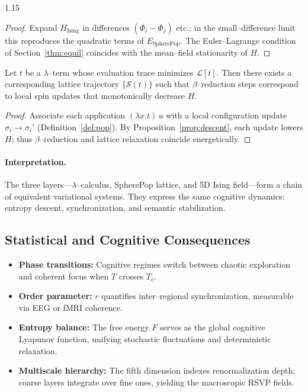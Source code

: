 \documentclass[12pt,a4paper]{article}
\begin{document}
\begin{spacing}{1.15}
\begin{proof}
Expand $H_{\text{Ising}}$ in differences
$(\Phi_i-\Phi_j)$ etc.;
in the small–difference limit this reproduces the quadratic
terms of $E_{\text{SpherePop}}$.
The Euler–Lagrange condition of Section~\ref{thm:equil}
coincides with the mean–field stationarity of $H$.
\end{proof}

\begin{theorem}
\label{thm:lambdaeq}
Let $t$ be a $\lambda$–term whose evaluation trace
minimizes $\mathcal{L}[t]$.
Then there exists a corresponding lattice trajectory
$\{\mathcal{S}(t)\}$ such that
$\beta$–reduction steps correspond to local spin updates
that monotonically decrease $H$.
\end{theorem}

\begin{proof}
Associate each application $(\lambda x.t)\,u$
with a local configuration update $\sigma_i\!\to\!\sigma_i'$
(Definition~\ref{def:pop}).
By Proposition~\ref{prop:descent}, each update lowers $H$;
thus $\beta$–reduction and lattice relaxation coincide energetically.
\end{proof}

\paragraph{Interpretation.}
The three layers—$\lambda$–calculus, SpherePop lattice,
and 5D Ising field—form a chain of equivalent
variational systems.
They express the same cognitive dynamics:
entropy descent, synchronization, and semantic stabilization.

\subsection{Statistical and Cognitive Consequences}

\begin{itemize}[leftmargin=1.2em]
\item \textbf{Phase transitions:}
  Cognitive regimes switch between chaotic exploration
  and coherent focus when $T$ crosses $T_c$.
\item \textbf{Order parameter:}
  $r$ quantifies inter–regional synchronization,
  measurable via EEG or fMRI coherence.
\item \textbf{Entropy balance:}
  The free energy $F$ serves as the global cognitive Lyapunov function,
  unifying stochastic fluctuations and deterministic relaxation.
\item \textbf{Multiscale hierarchy:}
  The fifth dimension indexes renormalization depth;
  coarse layers integrate over fine ones,
  yielding the macroscopic RSVP fields.
\end{itemize}


\end{spacing}
\end{document}
